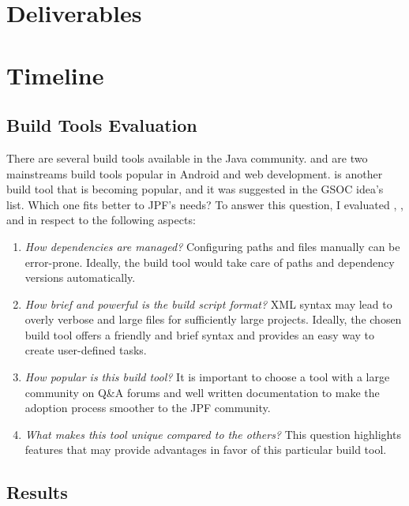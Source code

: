 \documentclass[a4paper]{article}
\begin{document}
\section{Deliverables}
\label{sec:deliv}

\section{Timeline}
\label{sec:time}

\clearpage
\begin{appendices}

\section{Build Tools Evaluation}
\label{sec:eval}

There are several build tools available in the Java community.
\maven{} and \gradle{} are two mainstreams build tools popular in Android and
web development.
\sbt{}\cite{page:sbt} is another build tool that is becoming popular, and it
was suggested in the GSOC idea's list\cite{page:jpf-gsoc18}.
Which one fits better to JPF's needs?
To answer this question, I evaluated \maven{}, \gradle{}, and \sbt{} in respect
to the following aspects:

\begin{enumerate}
\item \emph{How dependencies are managed?} Configuring paths and \jar{}
files manually can be error-prone. Ideally, the build tool would take care of
paths and dependency versions automatically.
\item \emph{How brief and powerful is the build script format?} XML syntax may
lead to overly verbose and large files for sufficiently large projects.
Ideally, the chosen build tool offers a friendly and brief syntax and provides
an easy way to create user-defined tasks.
\item \emph{How popular is this build tool?} It is important to choose a tool
with a large community on Q\&A forums and well written documentation to make
the adoption process smoother to the JPF community.
\item \emph{What makes this tool unique compared to the others?} This question
highlights features that may provide advantages in favor of this particular
build tool.
\end{enumerate}

\subsection{Results}
\label{sec:results}


\end{appendices}

\clearpage


\end{document}
